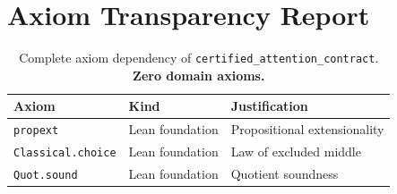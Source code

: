 \documentclass[11pt,a4paper]{article}
\newcommand{\E}{\mathbb{E}}
\newcommand{\Prob}{\mathbb{P}}
\newcommand{\mathlib}{\textsc{Mathlib}}
\newcommand{\ip}[2]{\langle #1,\, #2 \rangle}
\begin{document}
\begin{abstract}
\medskip\noindent
\textbf{Capstone.}\quad
The single conjunctive theorem
\texttt{certified\_attention\_contract} (Layer~5) unifies Layers~2 and~3:
\[
  \Bigl(\,\E\bigl[\hat{K}_m(q,k)\bigr] = e^{\ip{q}{k}}\Bigr)
  \;\wedge\;
  \Bigl(\Prob\!\bigl(|\hat{K}_m - e^{\ip{q}{k}}| \geq \varepsilon\bigr)
        \leq \delta\Bigr).
\]
A \texttt{\#print axioms} audit confirms that the entire certificate is
\textbf{100\% free of domain-specific axioms}. The Gaussian characteristic
function and the Hoeffding tail bound have been fully eliminated and replaced
with formal derivations referencing \mathlib{}'s \texttt{gaussianReal} and
\texttt{HasSubgaussianMGF} probability metrics. The capstone relies solely on
standard Lean/Mathlib foundations (\texttt{propext}, \texttt{Classical.choice},
and \texttt{Quot.sound}).

\medskip\noindent
\textbf{Companion Modules.}\quad
The repository additionally contains:
a \emph{Coalgebraic Substrate} defining denotational-operational coherence
for probabilistic programs;
a \emph{Sequential Composition} theorem bounding the risk of chained
modules by $\varepsilon_1 + \varepsilon_2$ over PMF bind;
and an \emph{Economics} layer formalizing value-risk equilibria under
no-arbitrage constraints.

\end{abstract}

\section*{Axiom Transparency Report}

\begin{table}[h]
\centering
\small
\begin{tabular}{@{}lll@{}}
\toprule
\textbf{Axiom} & \textbf{Kind} & \textbf{Justification} \\
\midrule
\texttt{propext} & Lean foundation & Propositional extensionality \\
\texttt{Classical.choice} & Lean foundation & Law of excluded middle \\
\texttt{Quot.sound} & Lean foundation & Quotient soundness \\
\bottomrule
\end{tabular}
\caption{Complete axiom dependency of \texttt{certified\_attention\_contract}. \textbf{Zero domain axioms.}}
\end{table}

\end{document}
